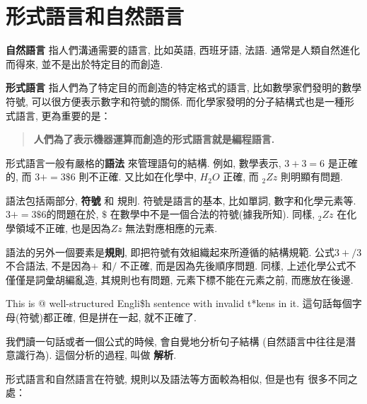\documentclass[10pt]{book}
\begin{document}



\section{形式語言和自然語言}

{\bf 自然語言} 指人們溝通需要的語言, 比如英語, 西班牙語, 法語. 
通常是人類自然進化而得來, 並不是出於特定目的而創造. 


{\bf 形式語言} 指人們為了特定目的而創造的特定格式的語言, 
比如數學家們發明的數學符號, 
可以很方便表示數字和符號的關係. 
而化學家發明的分子結構式也是一種形式語言, 更為重要的是：

\begin{quote}
{\bf 人們為了表示機器運算而創造的形式語言就是編程語言. }
\end{quote}

形式語言一般有嚴格的{\bf 語法} 來管理語句的結構. 例如, 
數學表示, $3 + 3 = 6$ 是正確的, 而 $3 + = 3 \$ 6$ 則不正確. 
又比如在化學中, $H_2O$ 正確, 而 $_2Zz$ 則明顯有問題. 

語法包括兩部分, {\bf 符號} 和 規則. 
符號是語言的基本, 比如單詞, 數字和化學元素等. 
$3 += 3 \$ 6$的問題在於, \(\$\) 在數學中不是一個合法的符號(據我所知). 
同樣, $_2Zz$ 在化學領域不正確, 也是因為$Zz$ 無法對應相應的元素. 

語法的另外一個要素是{\bf 規則}, 即把符號有效組織起來所遵循的結構規範. 
公式$3 +/ 3$ 不合語法, 不是因為$+$ 和$/$ 不正確, 而是因為先後順序問題. 
同樣, 上述化學公式不僅僅是詞彙胡編亂造, 其規則也有問題, 元素下標不能在元素之前, 
而應放在後邊. 

This is @ well-structured Engli\$h
sentence with invalid t*kens in it. 這句話每個字母(符號)都正確, 
但是拼在一起, 就不正確了. 

我們讀一句話或者一個公式的時候, 會自覺地分析句子結構
(自然語言中往往是潛意識行為). 這個分析的過程, 叫做 {\bf 解析}. 

形式語言和自然語言在符號, 規則以及語法等方面較為相似, 但是也有
很多不同之處：
\end{document}

